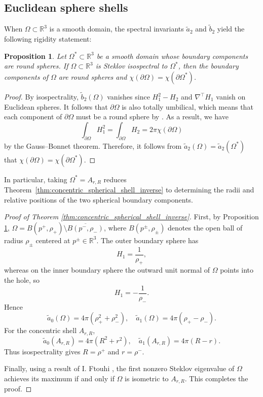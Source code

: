 \documentclass[11pt]{amsart}
\newtheorem{proposition}[theorem]{Proposition}
\theoremstyle{definition}
\numberwithin{equation}{section}
\begin{document}
\subsection{Euclidean sphere shells}
When $\Omega\subset\mathbb R^3$ is a smooth domain, the spectral invariants $\tilde a_2$ and $\tilde b_2$ yield the following rigidity statement:
\begin{proposition}
    \label{prop: isospectral to totally umbilical}
    Let $\Omega^*\subset\mathbb R^3$ be a smooth domain whose boundary components are round spheres. If $\Omega\subset\mathbb R^3$ is Steklov isospectral to $\Omega^*$, then the boundary components of $\Omega$ are round spheres and $\chi(\partial\Omega) = \chi(\partial\Omega^*)$. 
\end{proposition}
\begin{proof}
    By isospectrality, $\tilde b_2(\Omega)$ vanishes since $H_1^2-H_2$ and $\nabla^\top H_1$ vanish on Euclidean spheres. It follows that $\partial\Omega$ is also totally umbilical, which means that each component of  $\partial\Omega$ must be a round sphere by \cite[Theorem 19]{spivak1970comprehensive}. As a result, we have 
    \[\int_{\partial\Omega}H_1^2 = \int_{\partial\Omega}H_2 = 2\pi\chi(\partial\Omega)\]
    by the Gauss--Bonnet theorem. Therefore, it follows from $\tilde a_2(\Omega) = \tilde a_2(\Omega^*)$ that $\chi(\partial\Omega) = \chi(\partial\Omega^*)$.
\end{proof}


In particular, taking $\Omega^*=A_{r,R}$ reduces Theorem~\ref{thm:concentric_spherical_shell_inverse} to determining the radii and relative positions of the two spherical boundary components.  
\begin{proof}[Proof of Theorem \ref{thm:concentric_spherical_shell_inverse}]
    First, by Proposition \ref{prop: isospectral to totally umbilical}, $\Omega =  B(p^+,\rho_+)\setminus \overline{B(p^-,\rho_-)}$, where $B(p^\pm,\rho_\pm)$ denotes the open ball of radius $\rho_\pm$ centered at $p^\pm\in\mathbb R^3$. The outer boundary sphere has
    \[H_1=\frac{1}{\rho_+},\]
    whereas on the inner boundary sphere the outward unit normal of $\Omega$ points into the hole, so
    \[H_1=-\frac{1}{\rho_-}.\]
    Hence
    \[\tilde a_0(\Omega) = 4\pi(\rho_+^2+\rho_-^2), \quad \tilde a_1(\Omega) = 4\pi(\rho_+-\rho_-).\]
    For the concentric shell $A_{r,R}$,
\[\widetilde a_0(A_{r,R}) = 4\pi(R^2+r^2), \quad
\widetilde a_1(A_{r,R}) = 4\pi(R-r).\]
Thus isospectrality gives $R = \rho^+$ and $r = \rho^-$.

Finally, using a result of I. Ftouhi \cite[Theorem 1.1]{ftouhiWherePlaceSpherical2025}, the first nonzero Steklov eigenvalue of $\Omega$ achieves its maximum if and only if $\Omega$ is isometric to $A_{r,R}$. This completes the proof.
\end{proof}
\end{document}
